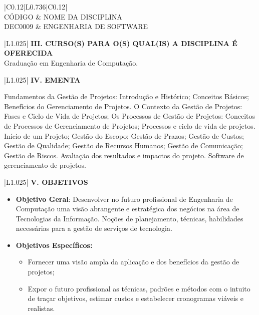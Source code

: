 \documentclass[12pt]{article}
\newcommand{\requisitoA}{DEC0009 & ENGENHARIA DE SOFTWARE}
\newcommand{\requisitoB}{}
\newcommand{\requisitoC}{}
\newcommand{\cursoA}{Graduação em Engenharia de Computação. \\ \hline}
\newcommand{\cursoC}{}
\newcommand{\ementa}{

Fundamentos da Gestão de Projetos: Introdução e Histórico; Conceitos Básicos; Benefícios do Gerenciamento de Projetos. O Contexto da Gestão de Projetos: Fases e Ciclo de Vida de Projetos; Os Processos de Gestão de Projetos: Conceitos de Processos de Gerenciamento de Projetos; Processos e ciclo de vida de projetos. Início de um Projeto; Gestão do Escopo; Gestão de Prazos; Gestão de Custos; Gestão de Qualidade; Gestão de Recursos Humanos; Gestão de Comunicação; Gestão de Riscos. Avaliação dos resultados e impactos do projeto. Software de gerenciamento de projetos.
 \\ \hline
}
\begin{document}
\begin{longtable}{|C{0.12\textwidth}|L{0.736\textwidth}|C{0.12\textwidth}|} \hline
%
 \\ \hline
%
CÓDIGO & NOME DA DISCIPLINA \\ \hline	
%
\requisitoA \\ \hline
\requisitoB
\requisitoC
\end{longtable}


\begin{longtable}{|L{1.025\textwidth}|} \hline
%
{\bf III. CURSO(S) PARA O(S) QUAL(IS) A DISCIPLINA É OFERECIDA } \\ \hline
%
\cursoA 
\cursoB
\cursoC

\end{longtable}

\begin{longtable}{|L{1.025\textwidth}|} \hline
%
{\bf IV. EMENTA } \\ \hline
%
\ementa
\end{longtable}

\newpage



\begin{longtable}{|L{1.025\textwidth}|} \hline
%
{\bf V. OBJETIVOS } \\ \hline
%
\begin{itemize}
\item \textbf{Objetivo Geral}: Desenvolver no futuro profissional de Engenharia de Computação uma visão abrangente e estratégica dos negócios na área de Tecnologias da Informação. Noções de planejamento, técnicas, habilidades necessárias para a gestão de serviços de
tecnologia.
\item \textbf{Objetivos Específicos:}
\begin{itemize}
\item Fornecer uma visão ampla da aplicação e dos benefícios da gestão de projetos;
\item Expor o futuro profissional as técnicas, padrões e métodos com o intuito de traçar
objetivos, estimar custos e estabelecer cronogramas viáveis e realistas.
\end{itemize}
\end{itemize}
\\ \hline
\end{longtable}
\end{document}
